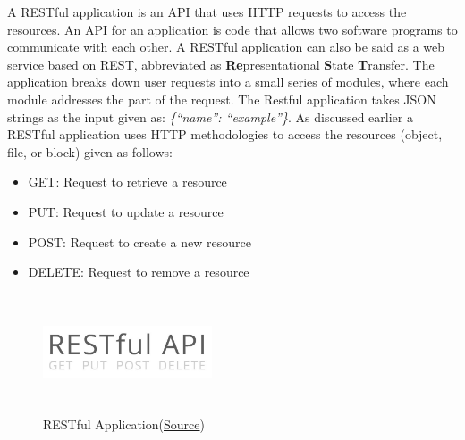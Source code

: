 \documentclass[12pt]{article}
\begin{document}
A RESTful application is an \ac{API} that uses HTTP requests to access the resources. An API for an application is code that allows two software programs to communicate with each other.
A RESTful application can also be said as a web service based on REST, abbreviated as \textbf{Re}presentational \textbf{S}tate \textbf{T}ransfer. The application breaks down user requests into a small series of modules, where each module addresses the part of the request. The Restful application takes JSON strings as the input given as: \emph{\{“name”: “example”\}}. As discussed earlier a RESTful application uses HTTP methodologies to access the resources (object, file, or block) given as follows:
\begin{itemize}
    \item GET: Request to retrieve a resource
    \item PUT: Request to update a resource
    \item POST: Request to create a new resource
    \item DELETE: Request to remove a resource
\end{itemize}
\begin{figure}[H]
    \centering
    \includegraphics[width=5cm, height=3.5cm]{../report_MemeEcon/images/restful_api.jpg}
    \caption{RESTful Application(\href{https://b2evolution.net/man/rest-api/}{Source})}
    \label{fig:Restful}
\end{figure}
\end{document}
